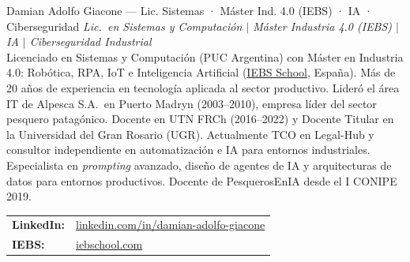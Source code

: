 \documentclass[12pt,a4paper]{article}
\begin{document}
\begin{docentebox}[pescaocean]{Damian Adolfo Giacone — Lic. Sistemas · Máster Ind. 4.0 (IEBS) · IA · Ciberseguridad}
  {\small\itshape\color{pescaocean}
    Lic.\ en Sistemas y Computación $|$ Máster Industria 4.0 (IEBS) $|$ IA $|$ Ciberseguridad Industrial}\\[5pt]
  Licenciado en Sistemas y Computación (PUC Argentina) con Máster en Industria 4.0:
  Robótica, RPA, IoT e Inteligencia Artificial
  (\href{https://www.iebschool.com/}{IEBS School}, España). Más de 20 años de experiencia
  en tecnología aplicada al sector productivo. Lideró el área IT de Alpesca S.A.\ en
  Puerto Madryn (2003--2010), empresa líder del sector pesquero patagónico. Docente en
  UTN FRCh (2016--2022) y Docente Titular en la Universidad del Gran Rosario (UGR).
  Actualmente TCO en Legal-Hub y consultor independiente en automatización e IA para
  entornos industriales. Especialista en \textit{prompting} avanzado, diseño de agentes
  de IA y arquitecturas de datos para entornos productivos. Docente de PesquerosEnIA
  desde el I CONIPE 2019.\\[7pt]
  \begin{tabular}{@{}ll}
    \textbf{LinkedIn:} & \href{https://www.linkedin.com/in/damian-adolfo-giacone/}{linkedin.com/in/damian-adolfo-giacone} \\
    \textbf{IEBS:}     & \href{https://www.iebschool.com/}{iebschool.com} \\
  \end{tabular}
\end{docentebox}

\medskip
\end{document}

